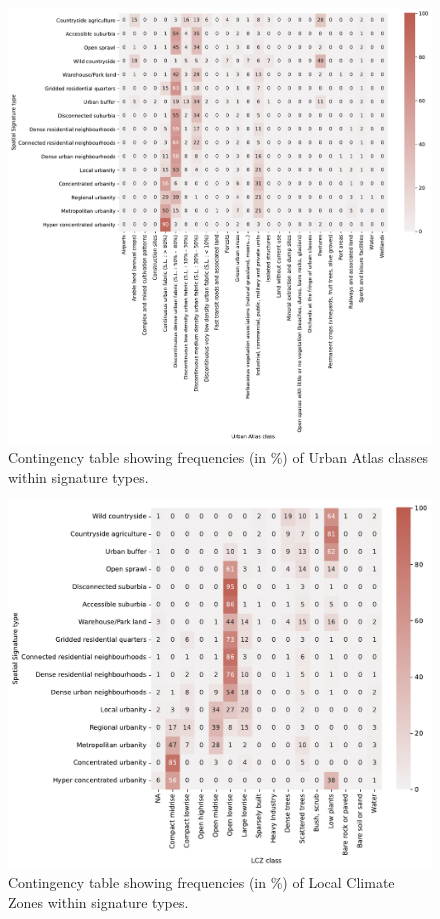 \documentclass[fleqn,10pt]{wlscirep}
\begin{document}
\begin{figure}[ht]
    \centering
    \includegraphics[width=\linewidth]{fig/crosstab_ua.pdf}
    \caption{Contingency table showing frequencies (in \%) of Urban Atlas classes within signature types.}
    \label{fig:crosstab_ua}
\end{figure}

\begin{figure}[ht]
    \centering
    \includegraphics[width=.8\linewidth]{fig/crosstab_lcz.pdf}
    \caption{Contingency table showing frequencies (in \%) of Local Climate Zones within signature types.}
    \label{fig:crosstab_lcz}
\end{figure}
\end{document}
